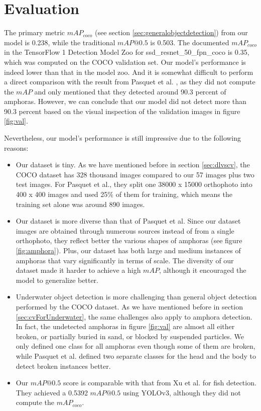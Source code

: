 \documentclass[a4paper, 11pt, oneside]{article}
\begin{document}
\section{Evaluation}

The primary metric $mAP_{coco}$ (see section \ref{sec:generalobjectdetection}) from our model is 0.238, while the
traditional $mAP@0.5$ is 0.503. The documented $mAP_{coco}$ in the TensorFlow 1 Detection Model Zoo for
ssd\_resnet\_50\_fpn\_coco is 0.35, which was computed on the COCO validation set. Our model's performance is indeed
lower than that in the model zoo. And it is somewhat difficult to perform a direct comparison with the result from
Pasquet et al. \cite{pasquet2017amphora}, as they did not compute the $mAP$ and only mentioned that they detected
around 90.3 percent of amphoras. However, we can conclude that our model did not detect more than 90.3 percent based
on the visual inspection of the validation images in figure \ref{fig:val}.

Nevertheless, our model's performance is still impressive due to the following reasons:

\begin{itemize}
  \item Our dataset is tiny. As we have mentioned before in section \ref{sec:dlvscv}, the COCO dataset has 328
  thousand images compared to our 57 images plus two test images. For Pasquet et al., they split one 38000 x 15000
  orthophoto into 400 x 400 images and used 25\% of them for training, which means the training set alone was around
  890 images.
  \item Our dataset is more diverse than that of Pasquet et al. Since our dataset images are obtained through
  numerous sources instead of from a single orthophoto, they reflect better the various shapes of amphoras (see
  figure \ref{fig:amphora}). Plus, our dataset has both large and medium instances of amphoras that vary significantly
  in terms of scale. The diversity of our dataset made it harder to achieve a high $mAP$, although it encouraged
  the model to generalize better.
  \item Underwater object detection is more challenging than general object detection performed by the COCO dataset.
  As we have mentioned before in section \ref{sec:cvForUnderwater}, the same challenges also apply to amphora
  detection. In fact, the undetected amphoras in figure \ref{fig:val} are almost all either broken, or partially buried
  in sand, or blocked by suspended particles. We only defined one class for all amphoras even though some of them are
  broken, while Pasquet et al. defined two separate classes for the head and the body to detect broken instances better.
  \item Our $mAP@0.5$ score is comparable with that from Xu et al. \cite{xu2018underwater} for fish detection. They
  achieved a 0.5392 $mAP@0.5$ using YOLOv3, although they did not compute the $mAP_{coco}$.
\end{itemize}
\end{document}
